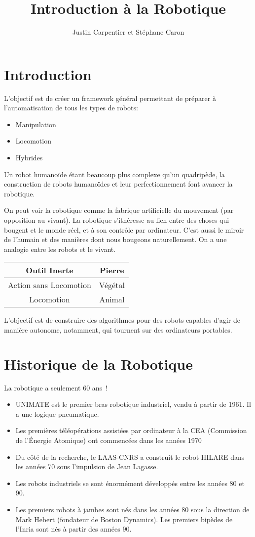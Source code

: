 \documentclass[math]{cours}
\title{Introduction à la Robotique}
\author{Justin Carpentier et Stéphane Caron}
\begin{document}
\bettertitle
\section*{Introduction}
L'objectif est de créer un framework général permettant de préparer à l'automatisation de tous les types de robots:
\begin{itemize}
	\item Manipulation
	\item Locomotion
	\item Hybrides
\end{itemize}
Un robot humanoïde étant beaucoup plus complexe qu'un quadripède, la construction de robots humanoïdes et leur perfectionnement font avancer la robotique.

On peut voir la robotique comme la fabrique artificielle du mouvement (par opposition au vivant).
La robotique s'itnéresse au lien entre des choses qui bougent et le monde réel, et à son contrôle par ordinateur.
C'est aussi le miroir de l'humain et des manières dont nous bougeons naturellement.
On a une analogie entre les robots et le vivant.
\begin{center}\begin{tabular}{cc}
		Outil Inerte           & Pierre  \\
		\midrule
		Action sans Locomotion & Végétal \\
		\midrule
		Locomotion             & Animal
	\end{tabular}\end{center}
L'objectif est de construire des algorithmes pour des robots capables d'agir de manière autonome, notamment, qui tournent sur des ordinateurs portables.

\section*{Historique de la Robotique}
La robotique a seulement 60 ans~!
\begin{itemize}
	\item UNIMATE est le premier bras robotique industriel, vendu à partir de 1961.
	      Il a une logique pneumatique.
	\item Les premières téléopérations assistées par ordinateur à la CEA (Commission de l'Énergie Atomique) ont commencées dans les années 1970
	\item Du côté de la recherche, le LAAS-CNRS a construit le robot HILARE dans les années 70 sous l'impulsion de Jean Lagasse.
	\item Les robots industriels se sont énormément développés entre les années 80 et 90.
	\item Les premiers robots à jambes sont nés dans les années 80 sous la direction de Mark Hebert (fondateur de Boston Dynamics).
	      Les premiers bipèdes de l'Inria sont nés à partir des années 90.
\end{itemize}
\end{document}
